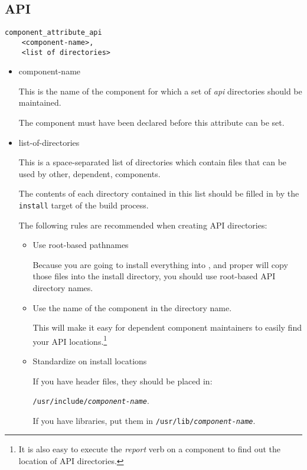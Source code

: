 \subsection{API}

\begin{verbatim}
component_attribute_api
    <component-name>,
    <list of directories>
\end{verbatim}

\begin{itemize}
\item component-name

  This is the name of the component for which a set of \emph{api}
  directories should be maintained.

  The component must have been declared before this attribute can be
  set.

\item list-of-directories

  This is a space-separated list of directories which contain files
  that can be used by other, dependent, components.

  The contents of each directory contained in this list should be
  filled in \destdir by the \texttt{install} target of the build
  process.

  The following rules are recommended when creating API directories:

  \begin{itemize}
    \item Use root-based pathnames

      Because you are going to install everything into \destdir, and
      \lmsbw proper will copy those files into the install directory,
      you should use root-based API directory names.

    \item Use the name of the component in the directory name.

      This will make it easy for dependent component maintainers to
      easily find your API locations.\footnote{It is also easy to
        execute the \emph{report} verb on a component to find out
        the location of API directories.}

    \item Standardize on install locations

      If you have header files, they should be placed in:
      
      \texttt{/usr/include/\emph{component-name}}.

      If you have libraries, put them in
      \texttt{/usr/lib/\emph{component-name}}.


\end{itemize}
\end{itemize}
